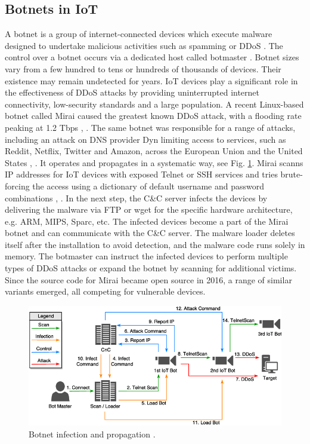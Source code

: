 \documentclass[conference, 11pt]{IEEEtran}
\begin{document}
    \subsection{Botnets in IoT}
    A botnet is a group of internet-connected devices which execute malware designed to undertake malicious activities such as spamming or DDoS \cite{article:6}.
    The control over a botnet occurs via a dedicated host called botmaster \cite{article:6}.
    Botnet sizes vary from a few hundred to tens or hundreds of thousands of devices.
    Their existence may remain undetected for years.
    IoT devices play a significant role in the effectiveness of DDoS attacks by providing uninterrupted internet connectivity, low-security standards and a large population.
    A recent Linux-based botnet called Mirai caused the greatest known DDoS attack, with a flooding rate peaking at 1.2 Tbps  \cite{article:16}, \cite{article:6}.
    The same botnet was responsible for a range of attacks, including an attack on DNS provider Dyn limiting access to services, such as Reddit, Netflix, Twitter and Amazon, across the European Union and the United States \cite{article:8}, \cite{article:16}.
    It operates and propagates in a systematic way, see Fig. \ref{fig:mirai}.
    Mirai scanns IP addresses for IoT devices with exposed Telnet or SSH services and tries brute-forcing the access using a dictionary of default username and password combinations \cite{article:8}, \cite{article:6}.
    In the next step, the C\&C server infects the devices by delivering the malware via FTP or wget for the specific hardware architecture, e.g. ARM, MIPS, Sparc, etc.
    The infected devices become a part of the Mirai botnet and can communicate with the C\&C server.
    The malware loader deletes itself after the installation to avoid detection, and the malware code runs solely in memory.
    The botmaster can instruct the infected devices to perform multiple types of DDoS attacks or expand the botnet by scanning for additional victims.
    Since the source code for Mirai became open source in 2016, a range of similar variants emerged, all competing for vulnerable devices.

    \begin{figure}[htbp]
        \centerline{\includegraphics[width=\linewidth]{figures/botnet.png}}
        \caption{Botnet infection and propagation \cite{article:15}.}
        \label{fig:mirai}
    \end{figure}
\end{document}

